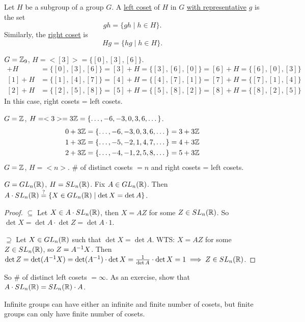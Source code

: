 \documentclass[]{article}
\begin{document}
\begin{definition}
	Let $H$ be a subgroup of a group $G$.
	A \ul{left coset} of $H$ in $G$ \ul{with representative} $g$ is the set $$gh = \{gh\mid h\in H\}.$$
	Similarly, the \ul{right coset} is $$Hg = \{hg\mid h\in H\}.$$
\end{definition}
\begin{example}
	$G = \mathbb{Z}_9$, $H = <[3]> = \{[0],[3],[6]\}$.
	\begin{align*}
		[0] + H &= \{[0],[3],[6]\} = [3] + H = \{[3],[6],[0]\} = [6] + H = \{[6],[0],[3]\} \\
		[1] + H &= \{[1],[4],[7]\} = [4] + H = \{[4],[7],[1]\} = [7] + H = \{[7],[1],[4]\} \\
		[2] + H &= \{[2],[5],[8]\} = [5] + H = \{[5],[8],[2]\} = [8] + H = \{[8],[2],[5]\}
	\end{align*}
	In this case, right cosets = left cosets.
\end{example}
\begin{example}
	$G = \mathbb{Z}$, $H = <3> = 3\mathbb{Z} = \{\dots,-6,-3,0,3,6,\dots\}$.
	\begin{align*}
		0 + 3\mathbb{Z} &= \{\dots,-6,-3,0,3,6,\dots\} = 3+3\mathbb{Z} \\
		1 + 3\mathbb{Z} &= \{\dots,-5,-2,1,4,7,\dots\} = 4+3\mathbb{Z} \\
		2 + 3\mathbb{Z} &= \{\dots,-4,-1,2,5,8,\dots\} = 5+3\mathbb{Z}
	\end{align*}
	$G = \mathbb{Z}$, $H = <n>$. \# of distinct cosets $=n$ and right cosets = left cosets.
\end{example}
\begin{example}
	$G = GL_n(\mathbb{R})$, $H = SL_n(\mathbb{R})$. Fix $A\in GL_n(\mathbb{R})$.
	Then $A\cdot SL_n(\mathbb{R}) \overset{?}{=} \{X\in GL_n(\mathbb{R})\mid\det X = \det A\}$.
	\begin{proof}
		\ul{$\subseteq$} Let $X\in A\cdot SL_n(\mathbb{R})$, then $X = AZ$ for some $Z\in SL_n(\mathbb{R})$. So $\det X = \det A \cdot \det Z = \det A\cdot 1$.
		
		\ul{$\supseteq$} Let $X\in GL_n(\mathbb{R})$ such that $\det X = \det A$.
		WTS: $X = AZ$ for some $Z\in SL_n(\mathbb{R})$, so $Z = A^{-1} X$.
		Then $\det Z = \det(A^{-1} X) = \det(A^{-1})\cdot \det X = \frac{1}{\det A}\cdot \det X = 1 \implies Z\in SL_n(\mathbb{R})$.
	\end{proof}
	So \# of distinct left cosets $=\infty$. As an exercise, show that $A\cdot SL_n(\mathbb{R}) = SL_n(\mathbb{R}) \cdot A$.
\end{example}
\begin{remark}
	Infinite groups can have either an infinite and finite number of cosets, but finite groups can only have finite number of cosets.
\end{remark}
\end{document}

